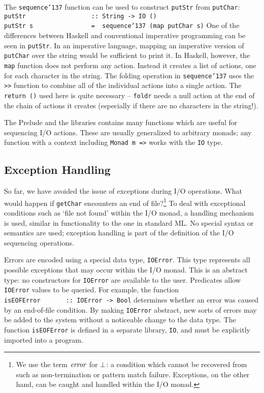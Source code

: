 The \mbox{\tt sequence{\char'137}} function can be used to construct \mbox{\tt putStr} from
\mbox{\tt putChar}: 
\bprog
\mbox{\tt putStr\ \ \ \ \ \ \ \ \ \ \ \ \ \ \ \ \ \ ::\ String\ ->\ IO\ ()}\\
\mbox{\tt putStr\ s\ \ \ \ \ \ \ \ \ \ \ \ \ \ \ \ =\ \ sequence{\char'137}\ (map\ putChar\ s)}
\eprog
One of the differences between Haskell and conventional
imperative programming can be seen in \mbox{\tt putStr}.  In an imperative
language, mapping an imperative version of \mbox{\tt putChar} over the string
would be sufficient to print it.  In Haskell, however, the \mbox{\tt map}
function does not perform any action.  Instead it creates a list of
actions, one for each character in the string.  The folding operation
in \mbox{\tt sequence{\char'137}}
uses the \mbox{\tt >>} function to combine all of the individual actions into a
single action.  The \mbox{\tt return\ ()} used here is  
quite necessary -- \mbox{\tt foldr} needs a null action at the end of the chain
of actions it creates (especially if there are no characters in the
string!). 

The Prelude and the libraries  contains many functions which are
useful for sequencing I/O actions.  These are usually generalized to
arbitrary monads; any function with a context including \mbox{\tt Monad\ m\ =>}
works with the \mbox{\tt IO} type. 

\subsection{Exception Handling}

So far, we have avoided the issue of exceptions during I/O operations.
What would happen if \mbox{\tt getChar} encounters an end of
file?\footnote{We use the term \mbox{$\it error$} for \mbox{$\it \bot$}: a condition which
cannot be recovered from such as non-termination or pattern match
failure.  Exceptions, on the other hand, can be caught and handled
within the I/O monad.}
To deal with exceptional conditions such as `file not found' within
the I/O monad, a handling mechanism is used, similar in functionality
to the one in standard ML. 
No special syntax or semantics are used; exception handling is part of
the definition of the I/O sequencing operations.

Errors are encoded using a special data type, \mbox{\tt IOError}.  This type
represents all possible exceptions that may occur within the I/O monad.
This is an abstract type: no constructors for \mbox{\tt IOError} are available
to the user.  Predicates allow \mbox{\tt IOError} values to be
queried.  For example, the function
\bprog
\mbox{\tt isEOFError\ \ \ \ \ \ \ ::\ IOError\ ->\ Bool}
\eprog
determines whether an error was caused by an end-of-file condition.
By making \mbox{\tt IOError} abstract, new sorts of errors may be added to the
system without a noticeable change to the data type.  The function
\mbox{\tt isEOFError} is defined in a separate library, \mbox{\tt IO}, and must be
explicitly imported into a program.

